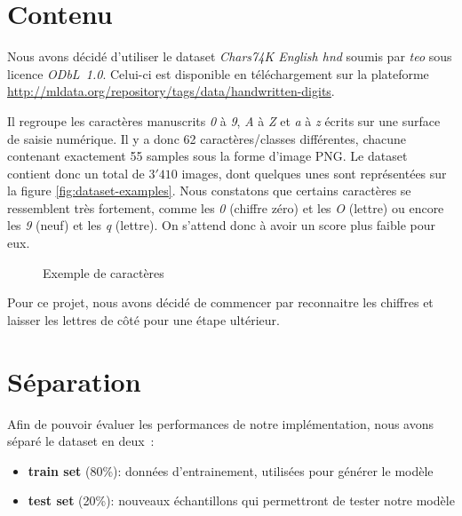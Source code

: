 

\section{Contenu}

Nous avons décidé d'utiliser le dataset \emph{Chars74K English hnd} soumis par \emph{teo} sous licence \emph{ODbL~1.0}. Celui-ci est disponible en téléchargement sur la plateforme \url{http://mldata.org/repository/tags/data/handwritten-digits}.

Il regroupe les caractères manuscrits \emph{0} à \emph{9}, \emph{A} à \emph{Z} et \emph{a} à \emph{z} écrits sur une surface de saisie numérique. Il y a donc 62 caractères/classes différentes, chacune contenant exactement 55 samples sous la forme d'image PNG. Le dataset contient donc un total de $3'410$ images, dont quelques unes sont représentées sur la figure \vref{fig:dataset-examples}. Nous constatons que certains caractères se ressemblent très fortement, comme les \emph{0} (chiffre zéro) et les \emph{O} (lettre) ou encore les \emph{9} (neuf) et les \emph{q} (lettre). On s'attend donc à avoir un score plus faible pour eux.

\begin{figure}[h]
\caption{Exemple de caractères}
\label{fig:dataset-examples}
\end{figure}

Pour ce projet, nous avons décidé de commencer par reconnaitre les chiffres et laisser les lettres de côté pour une étape ultérieur.


\section{Séparation}

Afin de pouvoir évaluer les performances de notre implémentation, nous avons séparé le dataset en deux~:
\begin{itemize}
\item \textbf{train set} (80\%): données d'entrainement, utilisées pour générer le modèle
\item \textbf{test set} (20\%): nouveaux échantillons qui permettront de tester notre modèle
\end{itemize} 

